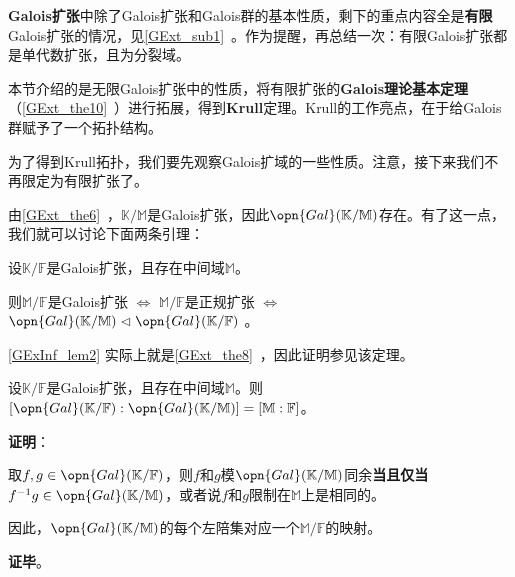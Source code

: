 


\textbf{Galois扩张}中除了Galois扩张和Galois群的基本性质，剩下的重点内容全是\textbf{有限}Galois扩张的情况，见\autoref{GExt_sub1}~。作为提醒，再总结一次：有限Galois扩张都是单代数扩张，且为分裂域。

本节介绍的是无限Galois扩张中的性质，将有限扩张的\textbf{Galois理论基本定理}（\autoref{GExt_the10}~）进行拓展，得到\textbf{Krull}定理。Krull的工作亮点，在于给Galois群赋予了一个拓扑结构。


为了得到Krull拓扑，我们要先观察Galois扩域的一些性质。注意，接下来我们不再限定为有限扩张了。


由\autoref{GExt_the6}~，$\mathbb{K}/\mathbb{M}$是Galois扩张，因此$\opn{Gal}(\mathbb{K}/\mathbb{M})$存在。有了这一点，我们就可以讨论下面两条引理：

\begin{lemma}{}\label{GExInf_lem2}
设$\mathbb{K}/\mathbb{F}$是Galois扩张，且存在中间域$\mathbb{M}$。

则$\mathbb{M}/\mathbb{F}$是Galois扩张 $\iff$ $\mathbb{M}/\mathbb{F}$是正规扩张 $\iff$ $\opn{Gal}(\mathbb{K}/\mathbb{M})\vartriangleleft \opn{Gal}(\mathbb{K}/\mathbb{F})$ 。
\end{lemma}

\autoref{GExInf_lem2} 实际上就是\autoref{GExt_the8}~，因此证明参见该定理。


\begin{lemma}{}\label{GExInf_lem1}
设$\mathbb{K}/\mathbb{F}$是Galois扩张，且存在中间域$\mathbb{M}$。则$[\opn{Gal}(\mathbb{K}/\mathbb{F}):\opn{Gal}(\mathbb{K}/\mathbb{M})]=[\mathbb{M}:\mathbb{F}]$。


\end{lemma}


\textbf{证明}：

取$f, g\in\opn{Gal}(\mathbb{K}/\mathbb{F})$，则$f$和$g$模$\opn{Gal}(\mathbb{K}/\mathbb{M})$同余\textbf{当且仅当}$f^{-1}g\in\opn{Gal}(\mathbb{K}/\mathbb{M})$，或者说$f$和$g$限制在$\mathbb{M}$上是相同的。

因此，$\opn{Gal}(\mathbb{K}/\mathbb{M})$的每个左陪集对应一个$\mathbb{M}/\mathbb{F}$的映射。

\textbf{证毕}。


